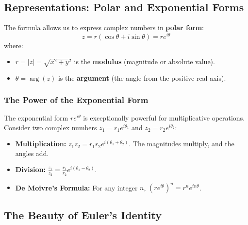 \subsection{Representations: Polar and Exponential Forms}

The formula allows us to express complex numbers in \textbf{polar form}:
\begin{equation}
    z = r(\cos \theta + i \sin \theta) = re^{i\theta}
\end{equation}
where:
\begin{itemize}
    \item $r = |z| = \sqrt{x^2 + y^2}$ is the \textbf{modulus} (magnitude or absolute value).
    \item $\theta = \arg(z)$ is the \textbf{argument} (the angle from the positive real axis).
\end{itemize}

\subsubsection{The Power of the Exponential Form}

The exponential form $re^{i\theta}$ is exceptionally powerful for multiplicative operations. Consider two complex numbers $z_1 = r_1 e^{i\theta_1}$ and $z_2 = r_2 e^{i\theta_2}$:
\begin{itemize}
    \item \textbf{Multiplication:} $z_1 z_2 = r_1 r_2 e^{i(\theta_1 + \theta_2)}$. The magnitudes multiply, and the angles add.
    \item \textbf{Division:} $\frac{z_1}{z_2} = \frac{r_1}{r_2} e^{i(\theta_1 - \theta_2)}$.
    \item \textbf{De Moivre's Formula:} For any integer $n$, $(re^{i\theta})^n = r^n e^{in\theta}$.
\end{itemize}

\subsection{The Beauty of Euler's Identity}


